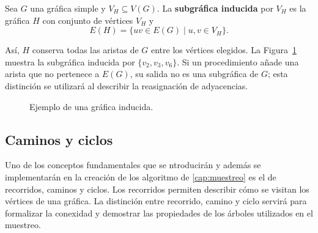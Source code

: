 \begin{definition}
\label{def:subgrafica-inducida}
Sea $G$ una gráfica simple y $V_H\subseteq V(G)$. La \textbf{subgráfica inducida} por $V_H$ es la gráfica $H$ con conjunto de vértices $V_H$ y
\[
E(H)=\{uv\in E(G)\mid u,v\in V_H\}.
\]
\end{definition}

Así, $H$ conserva todas las aristas de $G$ entre los vértices elegidos. La Figura~\ref{fig:GI} muestra la subgráfica inducida por $\{v_2,v_3,v_6\}$. Si un procedimiento añade una arista que no pertenece a $E(G)$, su salida no es una subgráfica de $G$; esta distinción se utilizará al describir la reasignación de adyacencias.

\begin{figure}[H]
    \centering
    \caption{Ejemplo de una gráfica inducida.}
    \label{fig:GI}
\end{figure}

\subsection{Caminos y ciclos}

Uno de los conceptos fundamentales que se ntroducirán y además se implementarán en la creación de los algoritmo de \ref{cap:muestreo} es el de recorridos, caminos y ciclos. Los recorridos permiten describir cómo se visitan los vértices de una gráfica. La distinción entre recorrido, camino y ciclo servirá para formalizar la conexidad y demostrar las propiedades de los árboles utilizados en el muestreo.

